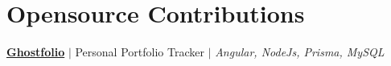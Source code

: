 \section{\textbf{Opensource Contributions}}
\resumeSubHeadingListStart

\resumeProjectHeading
{\href{https://github.com/ghostfolio/ghostfolio}{\textbf{Ghostfolio}} $|$ Personal Portfolio Tracker $|$ \emph{Angular, NodeJs, Prisma, MySQL}}    {}
\resumeItemListStart
{}
\resumeItemListEnd

\resumeSubHeadingListEnd